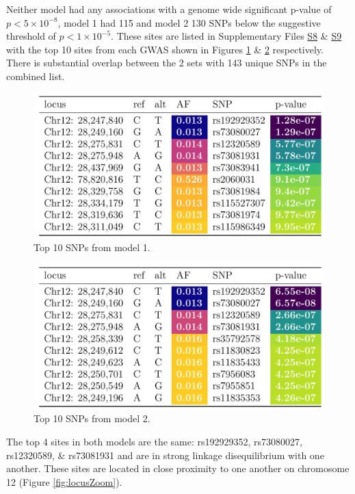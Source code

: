 \documentclass[
]{book}
\begin{document}
Neither model had any associations with a genome wide significant p-value of \(p < 5\times10^{-8}\), model 1 had 115 and model 2 130 SNPs below the suggestive threshold of \(p < 1\times10^{-5}\).
These sites are listed in Supplementary Files \href{Supplementary_Files/SF8_suggestivem1full.tsv}{S8} \& \href{Supplementary_Files/SF9_suggestivem2full.tsv}{S9} with the top 10 sites from each GWAS shown in Figures \ref{fig:m1tab} \& \ref{fig:m2tab} respectively.
There is substantial overlap between the 2 sets with 143 unique SNPs in the combined list.

\begin{figure}

{\centering \includegraphics[width=0.6\linewidth]{./figs/top10_pretty_m1} 

}

\caption{Top 10 SNPs from model 1.}\label{fig:m1tab}
\end{figure}



\begin{figure}

{\centering \includegraphics[width=0.6\linewidth]{./figs/top10_pretty_m2} 

}

\caption{Top 10 SNPs from model 2.}\label{fig:m2tab}
\end{figure}



The top 4 sites in both models are the same: rs192929352, rs73080027, rs12320589, \& rs73081931 and are in strong linkage disequilibrium with one another.
These sites are located in close proximity to one another on chromosome 12 (Figure \ref{fig:locusZoom}).
\end{document}
